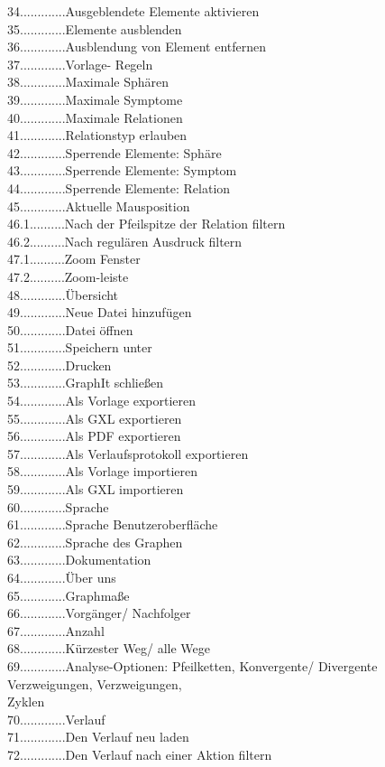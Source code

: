 \documentclass[enabledeprecatedfontcommands,fontsize=11pt,paper=a4,twoside]{scrartcl}
\newcounter{one}
\newcommand*{\hdo}{.............}
\begin{document}
34\hdo Ausgeblendete Elemente aktivieren\\
35\hdo Elemente ausblenden\\
36\hdo Ausblendung von Element entfernen\\
37\hdo  Vorlage- Regeln\\
38\hdo  Maximale Sphären\\
39\hdo  Maximale Symptome\\
40\hdo  Maximale Relationen\\
41\hdo  Relationstyp erlauben\\
42\hdo  Sperrende Elemente: Sphäre\\
43\hdo  Sperrende Elemente: Symptom\\
44\hdo  Sperrende Elemente: Relation\\
45\hdo Aktuelle Mausposition \\
46.1..........Nach der Pfeilspitze der Relation filtern \\
46.2..........Nach regulären Ausdruck filtern\\
47.1..........Zoom Fenster  \\
47.2..........Zoom-leiste \\
48\hdo  Übersicht \\
49\hdo Neue Datei hinzufügen\\
50\hdo Datei öffnen\\
51\hdo Speichern unter\\
52\hdo Drucken\\
53\hdo GraphIt schließen\\
54\hdo Als Vorlage exportieren\\
55\hdo Als GXL exportieren\\
56\hdo Als PDF exportieren\\
57\hdo Als Verlaufsprotokoll exportieren\\
58\hdo Als Vorlage importieren\\
59\hdo Als GXL importieren\\
60\hdo Sprache\\
61\hdo Sprache Benutzeroberfläche\\
62\hdo Sprache des Graphen\\
63\hdo Dokumentation\\
64\hdo Über uns \\
65\hdo Graphmaße\\
66\hdo Vorgänger/ Nachfolger\\
67\hdo Anzahl\\
68\hdo Kürzester Weg/ alle Wege\\
69\hdo Analyse-Optionen: Pfeilketten, Konvergente/ Divergente Verzweigungen, Verzweigungen,\\ 		
\hspace*{1.7cm} Zyklen\\
70\hdo Verlauf\\
71\hdo Den Verlauf neu laden\\
72\hdo Den Verlauf nach einer Aktion filtern\\ 
\end{document}

